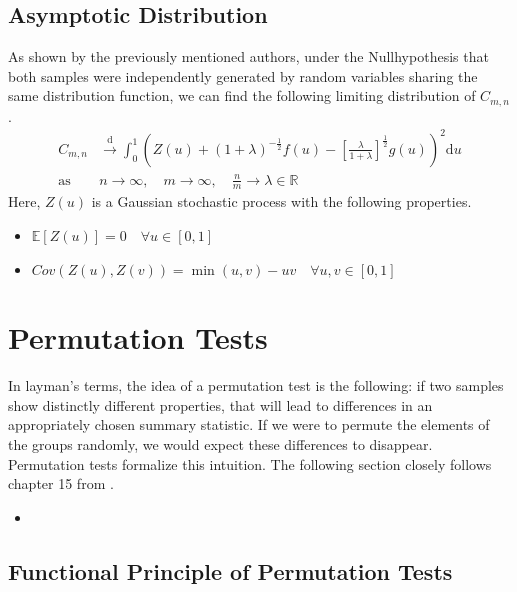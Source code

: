 \documentclass[12pt, a4paper]{article}
\theoremstyle{MAstyle} \newtheorem{assumption}{Assumption}[section]
\theoremstyle{MAstyle} \newtheorem{definition}{Definition}[section]
\theoremstyle{MAstyle} \newtheorem{theorem}{Theorem}[section]
\begin{document}
		\subsection{Asymptotic Distribution}
			As shown by the previously mentioned authors, under the Nullhypothesis that both samples were independently generated by random variables sharing the same distribution function, we can find the following limiting distribution of $C_{m,n}$.
			\begin{equation}
				\begin{split}
					C_{m,n} &\xrightarrow{\text{d}} \int_{0}^{1} \left(Z(u) + \left(1 + \lambda\right)^{-\frac{1}{2}} f(u) - \left[\frac{\lambda}{1+\lambda}\right]^{\frac{1}{2}}g(u)\right)^2 \mathrm{d}u \\
					\text{as} \quad &n \rightarrow \infty, \quad m \rightarrow \infty, \quad \frac{n}{m} \rightarrow \lambda \in \mathbb{R}
				\end{split}
			\end{equation}
			Here, $Z(u)$ is a Gaussian stochastic process with the following properties.
			\begin{itemize}
				\item $\mathbb{E}\left[Z(u)\right] = 0 \quad \forall u \in [0,1]$
				\item $Cov\left(Z(u), Z(v)\right) = \min(u,v) - uv \quad \forall u,v \in [0,1]$
			\end{itemize}					
			
	\section{Permutation Tests}\label{Permutation_Tests}
		In layman's terms, the idea of a permutation test is the following: if two samples show distinctly different properties, that will lead to differences in an appropriately chosen summary statistic. If we were to permute the elements of the groups randomly, we would expect these differences to disappear.
		Permutation tests formalize this intuition. The following section closely follows chapter 15 from \cite{lehmann_testing_2005}.
		
		\begin{itemize}
			\item \cite{van_der_vaart_weak_1996}
		\end{itemize}
	
		\subsection{Functional Principle of Permutation Tests}
		
\end{document}
